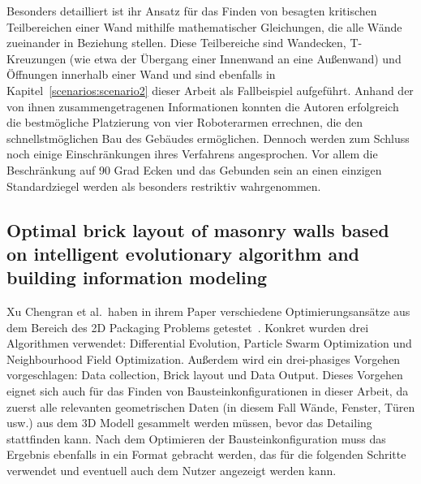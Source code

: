 Besonders detailliert ist ihr Ansatz für das Finden von besagten kritischen Teilbereichen einer Wand mithilfe mathematischer Gleichungen, die alle Wände zueinander in Beziehung stellen.
Diese Teilbereiche sind Wandecken, T-Kreuzungen (wie etwa der Übergang einer Innenwand an eine Außenwand) und Öffnungen innerhalb einer Wand und sind ebenfalls in Kapitel~\ref{scenarios:scenario2} dieser Arbeit als Fallbeispiel aufgeführt.
Anhand der von ihnen zusammengetragenen Informationen konnten die Autoren erfolgreich die bestmögliche Platzierung von vier Roboterarmen errechnen, die den schnellstmöglichen Bau des Gebäudes ermöglichen.
Dennoch werden zum Schluss noch einige Einschränkungen ihres Verfahrens angesprochen.
Vor allem die Beschränkung auf 90 Grad Ecken und das Gebunden sein an einen einzigen Standardziegel werden als besonders restriktiv wahrgenommen.

\subsection{Optimal brick layout of masonry walls based on intelligent evolutionary algorithm and building information modeling}
Xu Chengran et al.\ haben in ihrem Paper verschiedene Optimierungsansätze aus dem Bereich des 2D Packaging Problems getestet~\cite{Xu2021}.
Konkret wurden drei Algorithmen verwendet: Differential Evolution, Particle Swarm Optimization und Neighbourhood Field Optimization.
Außerdem wird ein drei-phasiges Vorgehen vorgeschlagen: Data collection, Brick layout und Data Output.
Dieses Vorgehen eignet sich auch für das Finden von Bausteinkonfigurationen in dieser Arbeit, da zuerst alle relevanten geometrischen Daten (in diesem Fall Wände, Fenster, Türen usw.) aus dem 3D Modell gesammelt werden müssen, bevor das Detailing stattfinden kann.
Nach dem Optimieren der Bausteinkonfiguration muss das Ergebnis ebenfalls in ein Format gebracht werden, das für die folgenden Schritte verwendet und eventuell auch dem Nutzer angezeigt werden kann.

